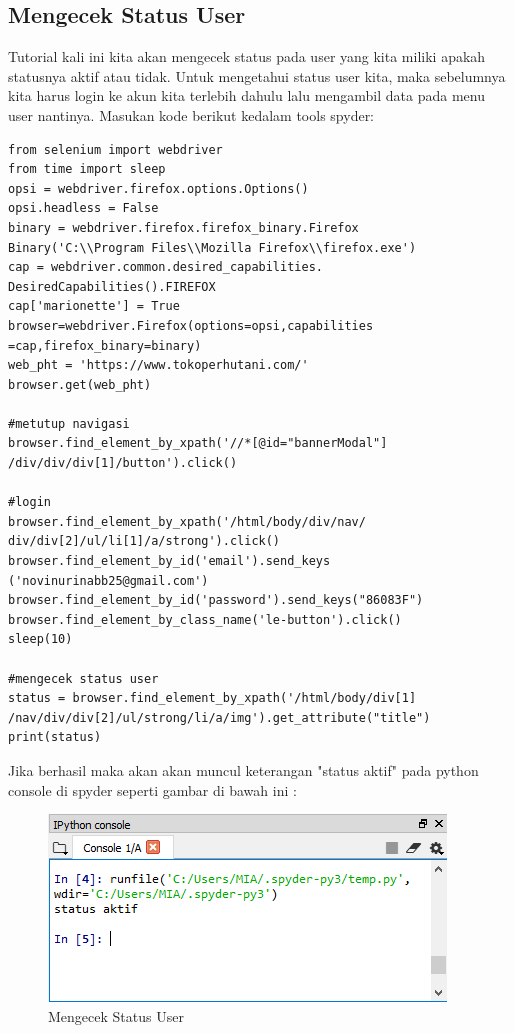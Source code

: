 \subsection{Mengecek Status User}
Tutorial kali ini kita akan mengecek status pada user yang kita miliki apakah statusnya aktif atau tidak. Untuk mengetahui status user kita, maka sebelumnya kita harus login ke akun kita terlebih dahulu lalu mengambil data pada menu user nantinya.
Masukan kode berikut kedalam tools spyder:
\begin{verbatim}
from selenium import webdriver
from time import sleep
opsi = webdriver.firefox.options.Options()
opsi.headless = False
binary = webdriver.firefox.firefox_binary.Firefox
Binary('C:\\Program Files\\Mozilla Firefox\\firefox.exe')
cap = webdriver.common.desired_capabilities.
DesiredCapabilities().FIREFOX
cap['marionette'] = True
browser=webdriver.Firefox(options=opsi,capabilities
=cap,firefox_binary=binary)
web_pht = 'https://www.tokoperhutani.com/'
browser.get(web_pht)

#metutup navigasi
browser.find_element_by_xpath('//*[@id="bannerModal"]
/div/div/div[1]/button').click()

#login
browser.find_element_by_xpath('/html/body/div/nav/
div/div[2]/ul/li[1]/a/strong').click()
browser.find_element_by_id('email').send_keys
('novinurinabb25@gmail.com')
browser.find_element_by_id('password').send_keys("86083F")
browser.find_element_by_class_name('le-button').click()
sleep(10)

#mengecek status user
status = browser.find_element_by_xpath('/html/body/div[1]
/nav/div/div[2]/ul/strong/li/a/img').get_attribute("title")
print(status)
\end{verbatim}

\newpage
Jika berhasil maka akan akan muncul keterangan "status aktif" pada python console di spyder seperti gambar di bawah ini :
\begin{figure}[h]
	\centering
	\includegraphics[scale=0.6]{figures/statususermia}
	\caption{Mengecek Status User}
\end{figure}



